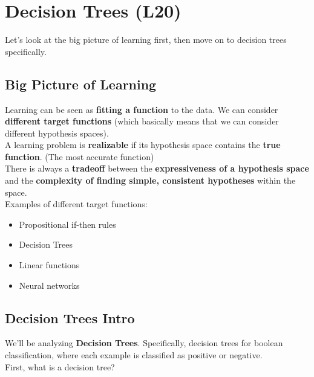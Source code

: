 \documentclass[english, 10pt]{article}
\begin{document}
\section{Decision Trees (L20)}

Let's look at the big picture of learning first, then move on to decision trees specifically.

\subsection{Big Picture of Learning}

Learning can be seen as \textbf{fitting a function} to the data. We can consider \textbf{different target functions} (which basically means that we can consider different hypothesis spaces).\\

A learning problem is \textbf{realizable} if its hypothesis space contains the \textbf{true function}. (The most accurate function)\\

There is always a \textbf{tradeoff} between the \textbf{expressiveness of a hypothesis space} and the \textbf{complexity of finding simple, consistent hypotheses} within the space.\\

Examples of different target functions:
\begin{itemize}
	\item Propositional if-then rules
	\item Decision Trees
	\item Linear functions
	\item Neural networks
\end{itemize}

\subsection{Decision Trees Intro}

We'll be analyzing \textbf{Decision Trees}. Specifically, decision trees for boolean classification, where each example is classified as positive or negative.\\

First, what is a decision tree?
\end{document}
